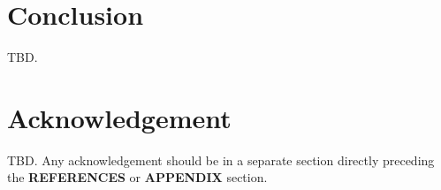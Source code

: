 \documentclass[a4paper,
               biblatex,       %
               keeplastbox,    %
               ]{jacow-2_1}    %
\newcommand\SEC[1]{\textbf{\uppercase{#1}}}
\begin{document}

\section{Conclusion} %
\label{sec:conclusion}
TBD.


\section{Acknowledgement} %
\label{sec:acknowledgement}
TBD. Any acknowledgement should be in a separate section directly preceding
the \SEC{References} or \SEC{Appendix} section.


\label{sec:references}
\printbibliography

\end{document}
